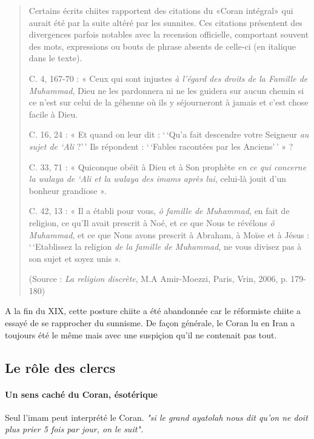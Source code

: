 \begin{quote}
Certains écrits chiites rapportent des citations du «Coran intégral»
qui aurait été par la suite altéré par les sunnites. Ces citations
présentent des divergences parfois notables avec la recension
officielle, comportant souvent des mots, expressions ou bouts de phrase
absents de celle-ci (en italique dans le texte).

C. 4, 167-70 : « Ceux qui sont injustes \emph{à l'égard des droits de la
Famille de Muhammad}, Dieu ne les pardonnera ni ne les guidera sur aucun
chemin si ce n'est sur celui de la géhenne où ils y séjourneront à
jamais et c'est chose facile à Dieu.

C. 16, 24 : « Et quand on leur dit : `\,`Qu'a fait descendre votre
Seigneur \emph{au sujet de `Ali} ?'\,' Ils répondent : `\,`Fables
racontées par les Anciens'\,' » ?

C. 33, 71 : « Quiconque obéit à Dieu et à Son prophète \emph{en ce qui
concerne la walaya de `Ali et la walaya des imams après lui}, celui-là
jouit d'un bonheur grandiose ».

C. 42, 13 : « Il a établi pour vous, \emph{ô famille de Muhammad}, en
fait de religion, ce qu'Il avait prescrit à Noé, et ce que Nous te
révélons \emph{ô Muhammad}, et ce que Nous avons prescrit à Abraham, à
Moïse et à Jésus : `\,`Etablissez la religion \emph{de la famille de
Muhammad}, ne vous divisez pas à son sujet et soyez unis ».

(Source : \emph{La religion discrète}, M.A Amir-Moezzi, Paris, Vrin,
2006, p. 179-180)
\end{quote}
 
 A la fin du XIX, cette posture chiite a été abandonnée car le réformiste chiite a essayé de se rapprocher du sunnisme. De façon générale, le Coran lu en Iran a toujours été le même mais avec une suspiçion qu'il ne contenait pas tout.
 

 
  \subsection{Le rôle des clercs}
  
  \paragraph{Un sens caché du Coran, ésotérique} Seul l'imam peut interprété le Coran. \textit{"si le grand ayatolah nous dit qu'on ne doit plus prier 5 fois par jour, on le suit".} 
 
